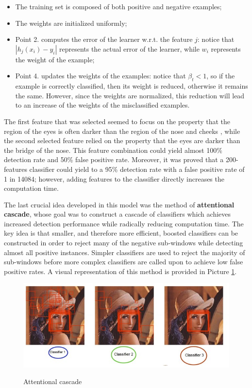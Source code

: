 \begin{itemize}
    \item The training set is composed of both positive and negative examples;
    \item The weights are initialized uniformly;
    \item Point 2. computes the error of the learner w.r.t. the feature $j$: notice that $|h_j(x_i) - y_i|$ represents the actual error of the learner, while $w_i$ represents the weight of the example;
    \item Point 4. updates the weights of the examples: notice that $\beta_t < 1$, so if the example is correctly classified, then its weight is reduced, otherwise it remains the same. However, since the weights are normalized, this reduction will lead to an increase of the weights of the misclassified examples.
\end{itemize}

The first feature that was selected seemed to focus on the property that the region of the eyes is often darker than the region of the nose and cheeks , while the second selected feature relied on the property that the eyes are darker than the bridge of the nose. This feature combination could yield almost 100\% detection rate and 50\% false positive rate. Moreover, it was proved that a 200-features classifier could yield to a 95\% detection rate with a false positive rate of 1 in 14084; however, adding features to the classifier directly increases the computation time.

The last crucial idea developed in this model was the method of \textbf{attentional cascade}, whose goal was to construct a cascade of classifiers which achieves increased detection performance while radically reducing computation time. The key idea is that smaller, and therefore more efficient, boosted classifiers can be constructed in order to reject many of the negative sub-windows while detecting almost all positive instances. Simpler classifiers are used to reject the majority of sub-windows before more complex classifiers are called upon to achieve low false positive rates. A visual representation of this method is provided in Picture \ref{cascade}.

\begin{figure}[h!]
		\centering
		\includegraphics[scale = 1.8]{img/cascade.jpg}
        \label{cascade}
        \caption{Attentional cascade}
\end{figure}

